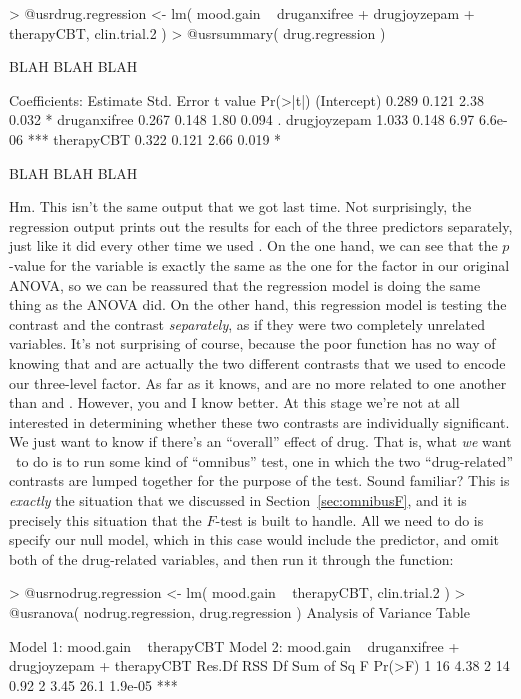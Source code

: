 \begin{rblock1}
> @usr{drug.regression <- lm( mood.gain ~ druganxifree + drugjoyzepam + therapyCBT, clin.trial.2 )}
> @usr{summary( drug.regression )}

BLAH BLAH BLAH 

Coefficients:
             Estimate Std. Error t value Pr(>|t|)    
(Intercept)     0.289      0.121    2.38    0.032 *  
druganxifree    0.267      0.148    1.80    0.094 .  
drugjoyzepam    1.033      0.148    6.97  6.6e-06 ***
therapyCBT      0.322      0.121    2.66    0.019 *   

BLAH BLAH BLAH
\end{rblock1}
Hm. This isn't the same output that we got last time. Not surprisingly, the regression output prints out the results for each of the three predictors separately, just like it did every other time we used . On the one hand, we can see that the $p$-value for the  variable is exactly the same as the one for the  factor in our original ANOVA, so we can be reassured that the regression model is doing the same thing as the ANOVA did. On the other hand, this regression model is testing the  contrast and the  contrast {\it separately}, as if they were two completely unrelated variables. It's not surprising of course, because the poor  function has no way of knowing that  and  are actually the two different contrasts that we used to encode our three-level  factor. As far as it knows,  and  are no more related to one another than  and . However, you and I know better. At this stage we're not at all interested in determining whether these two contrasts are individually significant. We just want to know if there's an ``overall'' effect of drug. That is, what {\it we} want \R\ to do is to run some kind of ``omnibus'' test, one in which the two ``drug-related'' contrasts are lumped together for the purpose of the test. Sound familiar? This is {\it exactly} the situation that we discussed in Section~\ref{sec:omnibusF}, and it is precisely this situation that the $F$-test is built to handle. All we need to do is specify our null model, which in this case would include the  predictor, and omit both of the drug-related variables, and then run it through the  function:
\begin{rblock1}
> @usr{nodrug.regression <- lm( mood.gain ~ therapyCBT, clin.trial.2 )}
> @usr{anova( nodrug.regression, drug.regression )}
Analysis of Variance Table

Model 1: mood.gain ~ therapyCBT
Model 2: mood.gain ~ druganxifree + drugjoyzepam + therapyCBT
  Res.Df  RSS Df Sum of Sq    F  Pr(>F)    
1     16 4.38                              
2     14 0.92  2      3.45 26.1 1.9e-05 ***
\end{rblock1}
